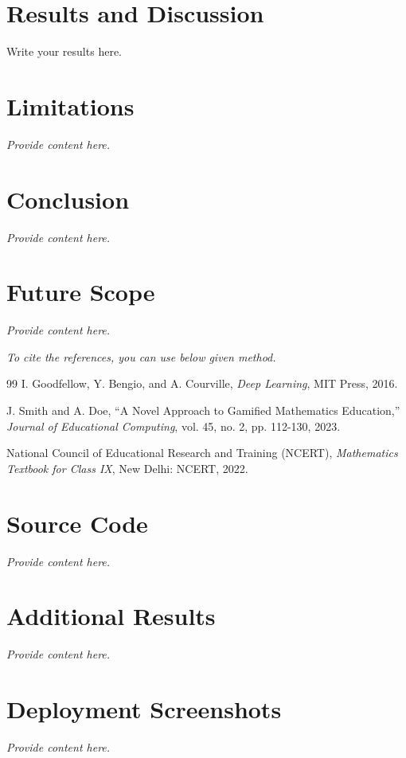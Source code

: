 \documentclass[12pt, a4paper]{article}
\begin{document}
\section{Results and Discussion}
Write your results here.

\section{Limitations}
\textit{Provide content here.}

\section{Conclusion}
\textit{Provide content here.}

\section{Future Scope}
\textit{Provide content here.}


\vspace{2cm}

\noindent \textit{To cite the references, you can use below given method.}


\cite{ref1} %
\cite{ref2}
\cite{ref3}
\begin{thebibliography}{99}
I. Goodfellow, Y. Bengio, and A. Courville, \textit{Deep Learning}, MIT Press, 2016.

J. Smith and A. Doe, ``A Novel Approach to Gamified Mathematics Education,'' \textit{Journal of Educational Computing}, vol. 45, no. 2, pp. 112-130, 2023.

National Council of Educational Research and Training (NCERT), \textit{Mathematics Textbook for Class IX}, New Delhi: NCERT, 2022.

\end{thebibliography}


\appendix 
\section{Source Code}
\textit{Provide content here.}

\section{Additional Results}
\textit{Provide content here.}

\section{Deployment Screenshots}
\textit{Provide content here.}
\end{document}
